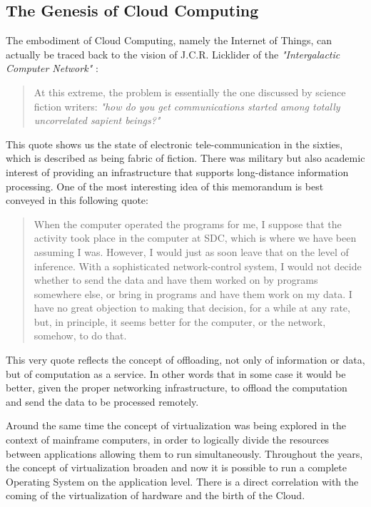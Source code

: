 \documentclass[11pt]{amsart}
\begin{document}
	\subsection{The Genesis of Cloud Computing}
	The embodiment of Cloud Computing, namely the Internet of Things, can actually be traced 
	back to the vision of J.C.R. Licklider of the \emph{"Intergalactic Computer Network"} 
	\cite{licklider}:
	\begin{quote}
		At this extreme, the problem is essentially the one discussed by science fiction 
		writers: \emph{"how do you get communications started among totally uncorrelated 
		sapient beings?"}
	\end{quote}
	This quote shows us the state of electronic tele-communication in the sixties, which is 
	described as being fabric of fiction. There was military but also academic interest of 
	providing an infrastructure that supports long-distance information processing. One of the most 
	interesting idea of this memorandum is best conveyed in this following quote:
	\begin{quote}
		When the computer operated the programs for me, I suppose
		that the activity took place in the computer at SDC, which
		is where we have been assuming I was. However, I would just
		as soon leave that on the level of inference. With a
		sophisticated network-control system, I would not decide
		whether to send the data and have them worked on by
		programs somewhere else, or bring in programs and have them
		work on my data. I have no great objection to making that
		decision, for a while at any rate, but, in principle, it
		seems better for the computer, or the network, somehow, to
		do that.
	\end{quote}
	This very quote reflects the concept of offloading, not only of information or data, but 
	of computation as a service. In other words that in some case it would be better, given the 
	proper networking infrastructure, to offload the computation and send the data to be 
	processed remotely.
	
	Around the same time the concept of virtualization was being explored in the context of 
	mainframe computers, in order to logically divide the resources between applications 
	allowing them to run simultaneously. Throughout the years, the concept of virtualization 
	broaden and now it is possible to run a complete Operating System on the application level.
	There is a direct correlation with the coming of the virtualization of hardware and the 
	birth of the Cloud. 
	
\end{document}
